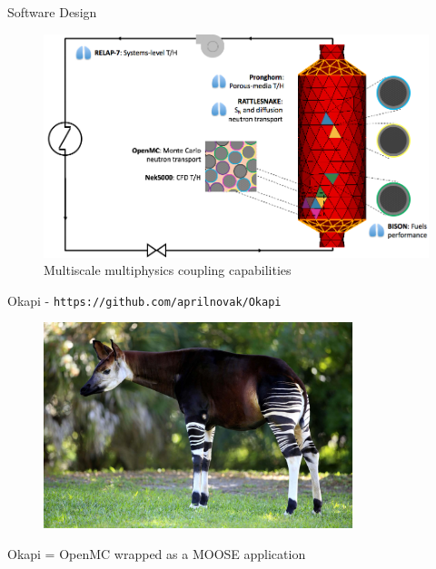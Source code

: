 \documentclass[10pt]{beamer}
\begin{document}
\begin{frame}{Software Design}

\begin{figure}
\includegraphics[width=12cm]{../Figures/MOOSE_capabilities.png}
\caption{Multiscale multiphysics coupling capabilities}
\end{figure}
\end{frame}

\begin{frame}{Okapi - {\tt https://github.com/aprilnovak/Okapi}}

\begin{figure}
\includegraphics[width=9cm]{../Figures/okapi_animal.jpg}
\end{figure}

\centering
Okapi = OpenMC wrapped as a MOOSE application
\end{frame}
\end{document}
